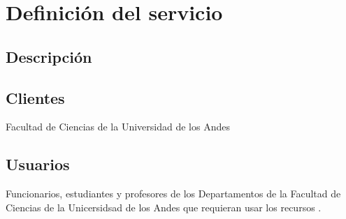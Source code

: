 \section{Definici\'on del servicio}
\subsection{Descripci\'on}

\subsection{Clientes}
Facultad de Ciencias de la Universidad de los Andes

\subsection{Usuarios}
Funcionarios, estudiantes y profesores de los Departamentos de la Facultad de Ciencias de la Unicersidsad de los Andes que requieran usar los recursos \icar.

